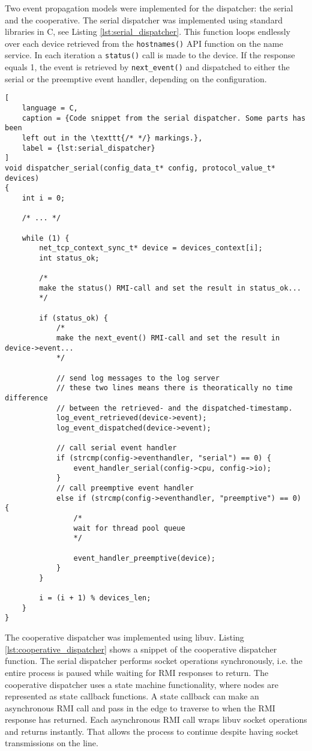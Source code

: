 Two event propagation models were implemented for the dispatcher: the serial
and the cooperative. The serial dispatcher was implemented using standard
libraries in C, see Listing \ref{lst:serial_dispatcher}. This function loops
endlessly over each device retrieved from the \texttt{hostnames()} API function
on the name service. In each iteration a \texttt{status()} call is made to the
device. If the response equals 1, the event is retrieved by
\texttt{next\_event()} and dispatched to either the serial or the preemptive
event handler, depending on the configuration.

\begin{lstlisting}[
    language = C,
    caption = {Code snippet from the serial dispatcher. Some parts has been
    left out in the \texttt{/* */} markings.},
    label = {lst:serial_dispatcher}
]
void dispatcher_serial(config_data_t* config, protocol_value_t* devices)
{
    int i = 0;

    /* ... */

    while (1) {
        net_tcp_context_sync_t* device = devices_context[i];
        int status_ok;

        /*
        make the status() RMI-call and set the result in status_ok...
        */

        if (status_ok) {
            /*
            make the next_event() RMI-call and set the result in device->event...
            */

            // send log messages to the log server
            // these two lines means there is theoratically no time difference
            // between the retrieved- and the dispatched-timestamp.
            log_event_retrieved(device->event);
            log_event_dispatched(device->event);

            // call serial event handler
            if (strcmp(config->eventhandler, "serial") == 0) {
                event_handler_serial(config->cpu, config->io);
            }
            // call preemptive event handler
            else if (strcmp(config->eventhandler, "preemptive") == 0) {
                /*
                wait for thread pool queue
                */

                event_handler_preemptive(device);
            }
        }

        i = (i + 1) % devices_len;
    }
}
\end{lstlisting}

The cooperative dispatcher was implemented using libuv. Listing
\ref{lst:cooperative_dispatcher} shows a snippet of the cooperative dispatcher
function. The serial dispatcher performs socket operations synchronously, i.e.
the entire process is paused while waiting for RMI responses to return. The
cooperative dispatcher uses a state machine functionality, where nodes are
represented as state callback functions. A state callback can make an
asynchronous RMI call and pass in the edge to traverse to when the RMI response
has returned. Each asynchronous RMI call wraps libuv socket operations and
returns instantly. That allows the process to continue despite having socket
transmissions on the line.

